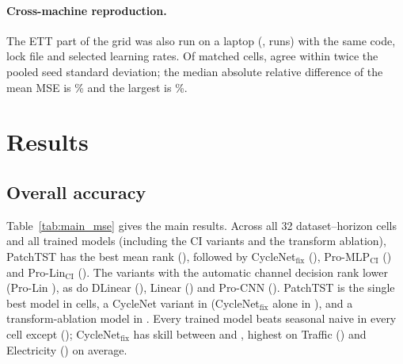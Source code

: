 \documentclass[11pt,a4paper]{article}
\begin{document}
\paragraph{Cross-machine reproduction.}
The ETT part of the grid was also run on a laptop (\vXmGpu{}, \vXmRuns{} runs) with the same code, lock file and selected learning rates. Of \vXmCells{} matched cells, \vXmAgree{} agree within twice the pooled seed standard deviation; the median absolute relative difference of the mean MSE is \vXmMedRel\% and the largest is \vXmMaxRel\%.

\section{Results}
\label{sec:results}

\begin{table}[!t]
\centering
\resizebox{\textwidth}{!}{%
%
}
\caption{\textbf{Controlled benchmark: test MSE (mean $\pm$ std over 3 seeds), $L=336$.} Per row, \textbf{bold} is the lowest and \underline{underlined} the second-lowest value (ties are all marked). S-Naive is deterministic. On ETTh1 the correlation test leaves channel mixing off, so Pro-Lin, Pro-MLP, Pro-CNN and Pro-SOR are the same models as their CI variants (Table~\ref{tab:ci_full}) and give the same numbers; Pro-Lin also equals CycleNet$_{\text{fix}}$ there, since discovery returns the known period (24). MAE is in Table~\ref{tab:main_mae} (appendix).}
\label{tab:main_mse}
\end{table}

\subsection{Overall accuracy}
\label{sec:res-overall}
Table~\ref{tab:main_mse} gives the main results. Across all 32 dataset--horizon cells and all \vNumTrainedModels{} trained models (including the CI variants and the transform ablation), PatchTST has the best mean rank (\vRankPatch), followed by CycleNet$_{\text{fix}}$ (\vRankFixed), Pro-MLP$_{\text{CI}}$ (\vRankProMlpCI) and Pro-Lin$_{\text{CI}}$ (\vRankProLinCI). The variants with the automatic channel decision rank lower (Pro-Lin \vRankProLin), as do DLinear (\vRankDLinear), Linear (\vRankLinear) and Pro-CNN (\vRankCNN). PatchTST is the single best model in \vBestPatch{} cells, a CycleNet variant in \vBestCycleFamily{} (CycleNet$_{\text{fix}}$ alone in \vBestFixed), and a transform-ablation model in \vBestTransform. Every trained model beats seasonal naive in every cell except \vSkillNeg{} (\vSkillNegWhere); CycleNet$_{\text{fix}}$ has skill between \vSkillMinFixed{} and \vSkillMaxFixed, highest on Traffic (\vSkillFixedTraffic) and Electricity (\vSkillFixedElectricity) on average.
\end{document}
